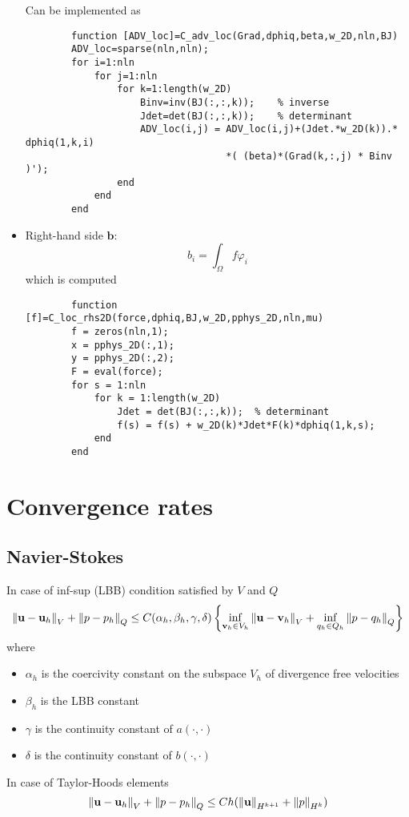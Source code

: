 \documentclass[a4paper,11pt]{article}
\theoremstyle{break}
\newcommand{\vect}[1]{\textbf{#1}}
\let\phi\varphi
\newcommand{\bilinear}{a(\cdot, \cdot)}
\newcommand{\uvec}{\vect{u}}
\newcommand{\vvec}{\vect{v}}
\numberwithin{equation}{section}
\begin{document}
\begin{itemize}
    Can be implemented as 
    \begin{verbatim}
        function [ADV_loc]=C_adv_loc(Grad,dphiq,beta,w_2D,nln,BJ)
        ADV_loc=sparse(nln,nln);
        for i=1:nln
            for j=1:nln
                for k=1:length(w_2D)
                    Binv=inv(BJ(:,:,k));    % inverse
                    Jdet=det(BJ(:,:,k));    % determinant 
                    ADV_loc(i,j) = ADV_loc(i,j)+(Jdet.*w_2D(k)).* dphiq(1,k,i)
                                   *( (beta)*(Grad(k,:,j) * Binv )');
                end
            end
        end
    \end{verbatim}
    \item Right-hand side \(\vect{b}\):
    \[
        b_i = \int_\Omega f\phi_i
    \]
    which is computed 
    \begin{verbatim}
        function [f]=C_loc_rhs2D(force,dphiq,BJ,w_2D,pphys_2D,nln,mu)
        f = zeros(nln,1);
        x = pphys_2D(:,1);
        y = pphys_2D(:,2);
        F = eval(force);
        for s = 1:nln
            for k = 1:length(w_2D)
                Jdet = det(BJ(:,:,k));  % determinant 
                f(s) = f(s) + w_2D(k)*Jdet*F(k)*dphiq(1,k,s);
            end    
        end
    \end{verbatim}
\end{itemize}
\section*{Convergence rates}
\subsection*{Navier-Stokes}
In case of inf-sup (LBB) condition satisfied by \(V\) and \(Q\)
\[
    \norm{\uvec-\uvec_h}_V + \norm{{p}-{p}_h}_Q \leq C(\alpha_h, \beta_h, \gamma, \delta)\left\{ \inf_{\vvec_h \in V_h}\norm{\uvec-\vvec_h}_V + \inf_{{q}_h \in Q_h}\norm{{p}-{q}_h}_Q \right\}
\]
where 
\begin{itemize}
    \item \(\alpha_h\) is the coercivity constant on the subspace \(V_h\) of divergence free velocities
    \item \(\beta_h\) is the LBB constant 
    \item \(\gamma\) is the continuity constant of \(\bilinear\)
    \item \(\delta\) is the continuity constant of \(b(\cdot,\cdot)\)
\end{itemize}
In case of Taylor-Hoods elements 
\[
    \norm{\uvec-\uvec_h}_V + \norm{{p}-{p}_h}_Q \leq Ch(\norm{\uvec}_{H^{k+1}} + \norm{p}_{H^k})
\]
\end{document}
